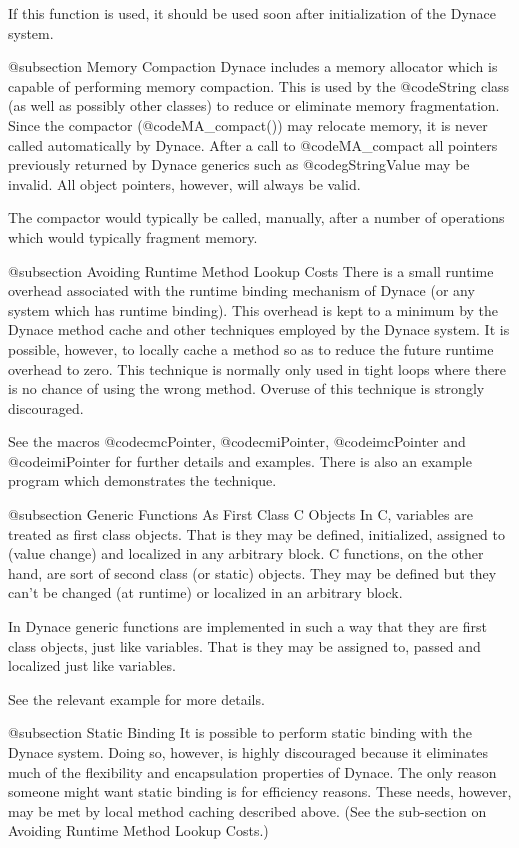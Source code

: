 If this function is used, it should be used soon after initialization
of the Dynace system.


@subsection Memory Compaction
Dynace includes a memory allocator which is capable of performing memory
compaction.  This is used by the @code{String} class (as well as
possibly other classes) to reduce or eliminate memory fragmentation.
Since the compactor (@code{MA_compact()}) may relocate memory, it is
never called automatically by Dynace.  After a call to @code{MA_compact}
all pointers previously returned by Dynace generics such as
@code{gStringValue} may be invalid.  All object pointers, however, will
always be valid.

The compactor would typically be called, manually, after a number of
operations which would typically fragment memory.


@subsection Avoiding Runtime Method Lookup Costs
There is a small runtime overhead associated with the runtime binding
mechanism of Dynace (or any system which has runtime binding).  This
overhead is kept to a minimum by the Dynace method cache and other techniques
employed by the Dynace system.  It is possible, however, to locally cache
a method so as to reduce the future runtime overhead to zero.  This
technique is normally only used in tight loops where there is no chance
of using the wrong method.  Overuse of this technique is strongly
discouraged.

See the macros @code{cmcPointer}, @code{cmiPointer}, @code{imcPointer} and
@code{imiPointer} for further details and examples.  There is also an
example program which demonstrates the technique.



@subsection Generic Functions As First Class C Objects
In C, variables are treated as first class objects.  That is they may
be defined, initialized, assigned to (value change) and localized in
any arbitrary block.  C functions, on the other hand, are sort of
second class (or static) objects.  They may be defined but they
can't be changed (at runtime) or localized in an arbitrary block.

In Dynace generic functions are implemented in such a way that they
are first class objects, just like variables.  That is they may
be assigned to, passed and localized just like variables.

See the relevant example for more details.


@subsection Static Binding
It is possible to perform static binding with the Dynace system.  Doing so,
however, is highly discouraged because it eliminates much of the
flexibility and encapsulation properties of Dynace.  The only reason
someone might want static binding is for efficiency reasons.  These
needs, however, may be met by local method caching described above.
(See the sub-section on Avoiding Runtime Method Lookup Costs.)

